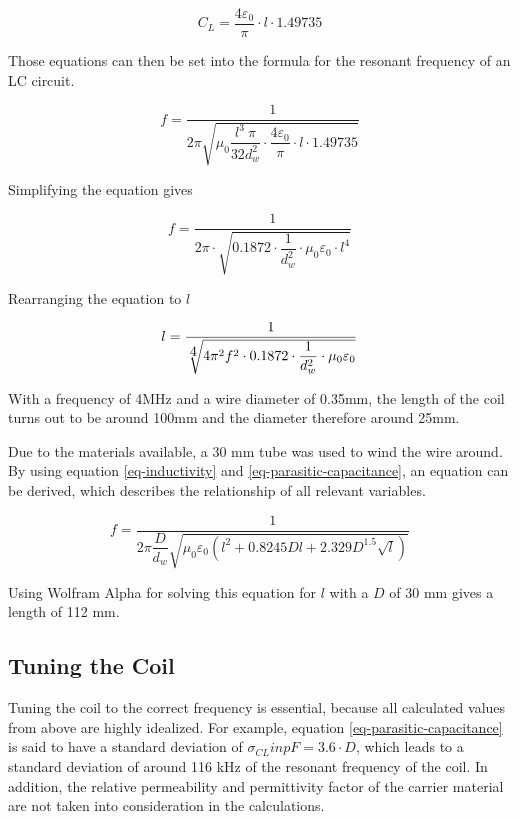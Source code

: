 \begin{equation}
    C_L = \frac{4\varepsilon_0}{\pi} \cdot l \cdot 1.49735
\end{equation}

Those equations can then be set into the formula for the resonant frequency of an LC circuit.

\begin{equation}
    f = \frac{1}{2\pi \sqrt{\mu_0 \dfrac{l^3\ \pi}{32 d_w^2} \cdot \dfrac{4\varepsilon_0}{\pi} \cdot l \cdot 1.49735}}
\end{equation}

Simplifying the equation gives

\begin{equation}
    f = \frac{1}{2\pi \cdot \sqrt{0.1872 \cdot \dfrac{1}{d_w^2} \cdot \mu_0 \varepsilon_0 \cdot l^4}}
\end{equation}

Rearranging the equation to \(l\)

\begin{equation}
    l = \frac{1}{\sqrt[\scalebox{1}{4}]{4\pi^2 f^2 \cdot0.1872 \cdot \dfrac{1}{d_w^2} \cdot \mu_0 \varepsilon_0}}
\end{equation}

With a frequency of 4MHz and a wire diameter of 0.35mm, the length of the coil turns out to be around 100mm and the diameter therefore around 25mm.

Due to the materials available, a 30 mm tube was used to wind the wire around. By using equation \ref{eq-inductivity} and \ref{eq-parasitic-capacitance}, an equation can be derived, which describes the relationship of all relevant variables.

\begin{equation}
    f = \frac{1}{2\pi \dfrac{D}{d_w} \sqrt{\mu_0 \varepsilon_0 \left( l^2 + 0.8245 D l + 2.329 D^{1.5} \sqrt{l} \right)}}
\end{equation}

Using Wolfram Alpha for solving this equation for \(l\) with a \(D\) of 30 mm gives a length of 112 mm.

\subsection{Tuning the Coil}

Tuning the coil to the correct frequency is essential, because all calculated values from above are highly idealized. For example, equation \ref{eq-parasitic-capacitance} is said to have a standard deviation of \(\sigma_{CL} in pF = 3.6 \cdot D\), which leads to a standard deviation of around 116 kHz of the resonant frequency of the coil. In addition, the relative permeability and permittivity factor of the carrier material are not taken into consideration in the calculations.

